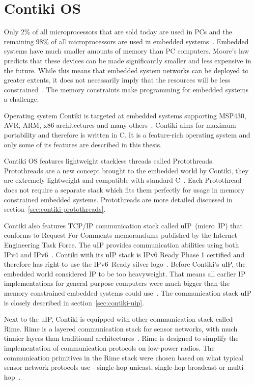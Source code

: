 
\chapter{Contiki OS}
Only 2\% of all microprocessors that are sold today are used in PCs and the remaining 98\%
of all microprocessors are used in embedded systems~\cite{thesis-programming}.
Embedded systems have much smaller amounts of memory than PC computers.
Moore's law predicts that these devices
can be made significantly smaller and less expensive in the future.
While this means that embedded system networks can
be deployed to greater extents, it does not necessarily imply
that the resources will be less constrained~\cite{paper-contiki}.
The memory constraints make programming for embedded systems a challenge.

Operating system Contiki is targeted at embedded systems supporting MSP430, AVR, ARM, x86
architectures and many others~\cite{contiki-docs}.
Contiki aims for maximum portability and therefore is written in C.
It is a feature-rich operating system and
only some of its features are described in this thesis.

Contiki OS features lightweight stackless threads called Protothreads.
Protothreads are a new concept brought to the embedded world by Contiki,
they are extremely lightweight and compatible with standard C~\cite{paper-protothreads}.
Each Protothread does not require a separate stack which fits them perfectly
for usage in memory constrained embedded systems.
Protothreads are more detailed discussed in section~\ref{sec:contiki-protothreads}.

Contiki also features TCP/IP communication stack called uIP~(micro~IP)
that conforms to Request For Comments memorandums published by the Internet Engineering Task Force.
The uIP provides communication abilities using both IPv4 and IPv6~\cite{contiki-docs}.
Contiki with its uIP stack is IPv6 Ready Phase 1 certified
and therefore has right to use the IPv6~Ready silver logo~\cite{ipv6ready-db}.
Before Contiki's uIP, the embedded world considered IP to be too heavyweight.
That means all earlier IP implementations for general purpose computers
were much bigger than the memory constrained embedded systems could use~\cite{interconnecting}.
The communication stack uIP is closely described in section~\ref{sec:contiki-uip}.

Next to the uIP, Contiki is equipped with other communication stack called Rime.
Rime is a layered communication stack for sensor networks,
with much tinnier layers than traditional architectures~\cite{paper-rime}.
Rime is designed to simplify the implementation of communication
protocols on low-power radios.
The communication primitives in the Rime stack were chosen
based on what typical sensor network protocols use -
single-hop unicast, single-hop broadcast or multi-hop~\cite{contiki-docs,paper-rime}.

